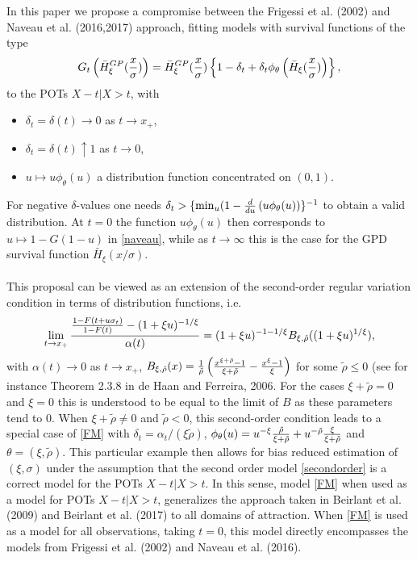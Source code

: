 \documentclass[a4paper,11pt]{article}
\begin{document}
In this paper we propose a compromise between the Frigessi et al. (2002) and Naveau et al. (2016,2017)  approach, fitting models with survival functions of the type
\begin{equation}
G_t \left(\bar{H}^{GP}_{\xi}({x \over \sigma})\right)
=
\bar{H}^{GP}_\xi ({x \over \sigma})\left\{1-\delta_t +\delta_t \phi_{\theta}\left( \bar{H}_\xi ( {x \over \sigma}) \right) \right\},
\label{FM}
\end{equation} 
to the POTs $X-t|X>t$, with 
\begin{itemize}
\item $\delta_t =\delta (t) \to 0$ as $t \to x_+$,
\item $\delta_t =\delta (t) \uparrow 1$ as $t  \to 0$,
\item $u \mapsto u\phi_\theta (u)$ a distribution function concentrated on $(0,1)$.
\end{itemize}
For negative $\delta$-values one needs $\delta_t > \{\min_u (1-{d \over du}\, (u\phi_\theta (u))\}^{-1}$ to obtain a valid distribution.  
  At $t=0$ the function $u\phi_{\theta}(u)$ then corresponds to $u \mapsto 1-G(1-u)$ in \eqref{naveau}, while as $t \to \infty$ this is the case for the GPD survival function $\bar{H}_\xi (x/\sigma)$.
  \\\\  
 This proposal can be viewed as an extension of  the second-order regular variation condition in terms of distribution functions, i.e. 
 \begin{equation}
 \lim_{t \to x_+}{ {1-F(t+u\sigma_t) \over 1-F (t)}- (1+\xi u)^{-1/\xi} \over \alpha (t)} = (1+\xi u)^{-1-1/\xi}B_{\xi,\tilde{\rho}}((1+\xi u)^{1/\xi}),
 \label{secondorder}
 \end{equation}
 with $\alpha(t) \to 0$ as $t \to x_+$, $B_{\xi,\tilde{\rho}}(x)= {1 \over \tilde\rho}\left({x^{\xi +\tilde{\rho}}-1 \over \xi +\tilde\rho}- {x^{\xi}-1 \over \xi}\right)$ for some $\tilde\rho \leq 0$ (see for instance Theorem 2.3.8 in de Haan and Ferreira, 2006. For the cases $\xi+\tilde\rho=0$ and $\xi=0$ this is understood to be equal to the limit of $B$ as these parameters tend to 0. When $\xi+\tilde\rho \neq 0$ and $\tilde\rho<0$, this second-order condition leads to  a special case of \eqref{FM} with $\delta_t = \alpha_t/(\xi\tilde{\rho})$,  $\phi_\theta (u) = u^{-\xi} {\tilde{\rho} \over \xi +\tilde{\rho}}+  u^{-\tilde{\rho}} {\xi \over \xi +\tilde{\rho}}$ and $\theta= (\xi,\tilde\rho)$. This particular example then allows for bias reduced estimation of $(\xi,\sigma)$ under the assumption that the second order model \eqref{secondorder} is a correct model for the POTs $X-t|X>t$. In this sense, model \eqref{FM} when used as a model for POTs $X-t|X>t$, generalizes the approach taken in Beirlant et al. (2009) and Beirlant et al. (2017) to all domains of attraction. When \eqref{FM} is used as a model for all observations, taking $t=0$, this model directly encompasses the models from Frigessi et al. (2002) 	and Naveau et al. (2016).\\
 
\end{document}
